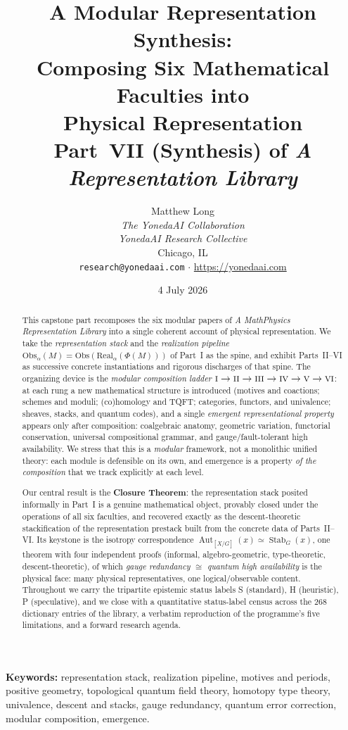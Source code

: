 \documentclass[12pt]{article}
\title{\textbf{A Modular Representation Synthesis:\\
Composing Six Mathematical Faculties into\\ Physical Representation}\\[0.6em]
\large Part~VII (Synthesis) of \emph{A \MtoP{} Representation Library}}
\author{Matthew Long \\
\textit{The YonedaAI Collaboration} \\
\textit{YonedaAI Research Collective} \\
Chicago, IL \\
\texttt{research@yonedaai.com} $\cdot$ \url{https://yonedaai.com}}
\date{4 July 2026}
\theoremstyle{definition}
\theoremstyle{remark}
\newcommand{\Real}{\mathrm{Real}}
\newcommand{\Obs}{\mathrm{Obs}}
\newcommand{\Aut}{\operatorname{Aut}}
\newcommand{\Stab}{\operatorname{Stab}}
\newcommand{\Sstat}{\textsf{S}}
\newcommand{\Hstat}{\textsf{H}}
\newcommand{\Pstat}{\textsf{P}}
\newcommand{\MtoP}{Math\textrightarrow{}Physics}
\newcommand{\PI}{\textsc{i}}
\newcommand{\PII}{\textsc{ii}}
\newcommand{\PIII}{\textsc{iii}}
\newcommand{\PIV}{\textsc{iv}}
\newcommand{\PV}{\textsc{v}}
\newcommand{\PVI}{\textsc{vi}}
\begin{document}
\maketitle

\begin{abstract}
This capstone part recomposes the six modular papers of \emph{A \MtoP{}
Representation Library} into a single coherent account of physical representation.
We take the \emph{representation stack} and the \emph{realization pipeline}
$\Obs_\alpha(M)=\Obs(\Real_\alpha(\Phi(M)))$ of Part~I as the spine, and exhibit
Parts~II--VI as successive concrete instantiations and rigorous discharges of that
spine.  The organizing device is the \emph{modular composition ladder}
$\PI\to\PII\to\PIII\to\PIV\to\PV\to\PVI$: at each rung a new mathematical structure
is introduced (motives and coactions; schemes and moduli; (co)homology and TQFT;
categories, functors, and univalence; sheaves, stacks, and quantum codes), and a
single \emph{emergent representational property} appears only after composition:
coalgebraic anatomy, geometric variation, functorial conservation, universal
compositional grammar, and gauge/fault-tolerant high availability.  We
stress that this is a \emph{modular} framework, not a monolithic unified theory:
each module is defensible on its own, and emergence is a property \emph{of the
composition} that we track explicitly at each level.

Our central result is the \textbf{Closure Theorem}: the representation stack
posited informally in Part~I is a genuine mathematical object, provably closed
under the operations of all six faculties, and recovered exactly as the
descent-theoretic stackification of the representation prestack built from the
concrete data of Parts~II--VI.  Its keystone is the isotropy correspondence
$\Aut_{[X/G]}(x)\simeq\Stab_G(x)$, one theorem with four independent proofs
(informal, algebro-geometric, type-theoretic, descent-theoretic), of which
\emph{gauge redundancy $\cong$ quantum high availability} is the physical face:
many physical representatives, one logical/observable content.  Throughout we carry
the tripartite epistemic status labels \Sstat{} (standard), \Hstat{} (heuristic),
\Pstat{} (speculative), and we close with a quantitative status-label census across
the $268$ dictionary entries of the library, a verbatim reproduction of the
programme's five limitations, and a forward research agenda.
\end{abstract}

\vspace{0.5em}
\noindent\textbf{Keywords:} representation stack, realization pipeline, motives and
periods, positive geometry, topological quantum field theory, homotopy type theory,
univalence, descent and stacks, gauge redundancy, quantum error correction,
modular composition, emergence.
\end{document}
